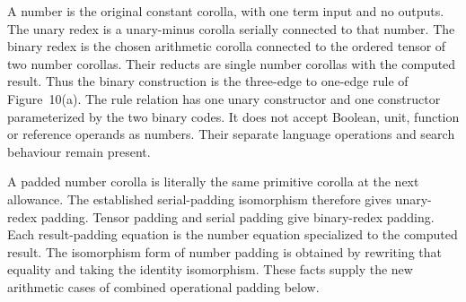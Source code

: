 




A number is the original constant corolla, with one term input and no outputs.
The unary redex is a unary-minus corolla serially connected to that number.
The binary redex is the chosen arithmetic corolla connected to the ordered
tensor of two number corollas. Their reducts are single number corollas with
the computed result. Thus the binary construction is the three-edge to
one-edge rule of Figure~10(a). The rule relation has one unary constructor
and one constructor parameterized by the two binary codes. It does not accept
Boolean, unit, function or reference operands as numbers. Their separate
language operations and search behaviour remain present.







A padded number corolla is literally the same primitive corolla at the
next allowance. The established serial-padding isomorphism therefore gives
unary-redex padding. Tensor padding and serial padding give binary-redex
padding. Each result-padding equation is the number equation specialized to
the computed result. The isomorphism form of number padding is obtained by
rewriting that equality and taking the identity isomorphism. These facts
supply the new arithmetic cases of combined operational padding below.




